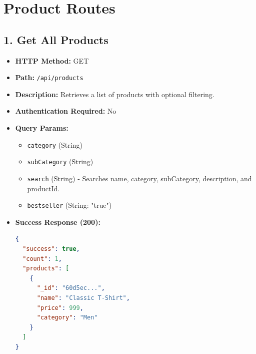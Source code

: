 \documentclass[12pt,a4paper]{article}
\begin{document}
\section{Product Routes}

\subsection{1. Get All Products}
\begin{itemize}
    \item \textbf{HTTP Method:} GET
    \item \textbf{Path:} \texttt{/api/products}
    \item \textbf{Description:} Retrieves a list of products with optional filtering.
    \item \textbf{Authentication Required:} No
    \item \textbf{Query Params:}
    \begin{itemize}
        \item \texttt{category} (String)
        \item \texttt{subCategory} (String)
        \item \texttt{search} (String) - Searches name, category, subCategory, description, and productId.
        \item \texttt{bestseller} (String: "true")
    \end{itemize}
    \item \textbf{Success Response (200):}
\begin{lstlisting}[language=json]
{
  "success": true,
  "count": 1,
  "products": [
    {
      "_id": "60d5ec...",
      "name": "Classic T-Shirt",
      "price": 999,
      "category": "Men"
    }
  ]
}
\end{lstlisting}
\end{itemize}
\end{document}
